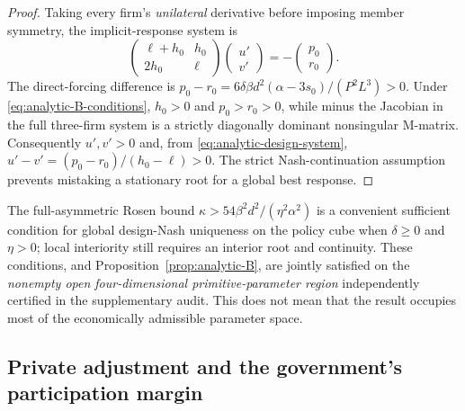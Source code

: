 \begin{proof}
Taking every firm's \emph{unilateral} derivative before
imposing member symmetry, the implicit-response system is
\begin{equation}\label{eq:analytic-design-system}
 \begin{pmatrix}\ell+h_0&h_0\\2h_0&\ell\end{pmatrix}
 \begin{pmatrix}u'\\v'\end{pmatrix}
 =-\begin{pmatrix}p_0\\r_0\end{pmatrix}.
\end{equation}
The direct-forcing difference is
$p_0-r_0=
6\delta\beta d^2(\alpha-3s_0)/(P^2L^3)>0$.
Under \eqref{eq:analytic-B-conditions}, $h_0>0$ and
$p_0>r_0>0$, while minus the Jacobian in the
full three-firm system is a strictly diagonally
dominant nonsingular M-matrix.
Consequently $u',v'>0$ and, from
\eqref{eq:analytic-design-system},
$u'-v'=(p_0-r_0)/(h_0-\ell)>0$.
The strict Nash-continuation assumption prevents
mistaking a stationary root for a global best response.
\end{proof}

The full-asymmetric Rosen bound
$\kappa>54\beta^2d^2/(\eta^2\alpha^2)$
is a convenient sufficient condition for global
design-Nash uniqueness on the policy cube when
$\delta\geq0$ and $\eta>0$; local interiority still
requires an interior root and continuity.
These conditions, and Proposition~\ref{prop:analytic-B},
are jointly satisfied on the \emph{nonempty open
four-dimensional primitive-parameter region}
independently certified in the supplementary audit.
This does not mean that the result occupies most
of the economically admissible parameter space.

\subsection{Private adjustment and the government's participation margin}

